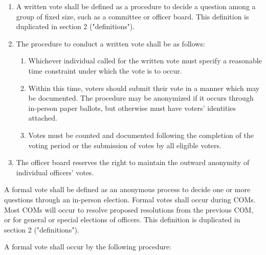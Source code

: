 \documentclass[11pt]{article}
\newcounter{h1}
\newcounter{h2}[h1]
\newcounter{h3}[h2]
\begin{document}


\begin{enumerate}
  \item A written vote shall be defined as a procedure to decide a question among a group of fixed size, such as a committee or officer board. This definition is duplicated in section 2 ("definitions").
  \item The procedure to conduct a written vote shall be as follows:
  \begin{enumerate}
    \item Whichever individual called for the written vote must specify a reasonable time constraint under which the vote is to occur.
    \item Within this time, voters should submit their vote in a manner which may be documented. The procedure may be anonymized if it occurs through in-person paper ballots, but otherwise must have voters' identities attached.
    \item Votes must be counted and documented following the completion of the voting period or the submission of votes by all eligible voters.
  \end{enumerate}
  \item The officer board reserves the right to maintain the outward anonymity of individual officers' votes.
\end{enumerate}



A formal vote shall be defined as an anonymous process to decide one or more questions through an in-person election. Formal votes shall occur during COMs. Most COMs will occur to resolve proposed resolutions from the previous COM, or for general or special elections of officers. This definition is duplicated in section 2 ("definitions").


A formal vote shall occur by the following procedure:
\end{document}
